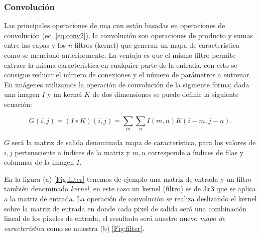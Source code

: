 \subsubsection{Convolución}\label{sub:convolucion}
Las principales operaciones de una \ac{cnn} están basadas en operaciones de convolución (ec. \eqref{eq:conv2}), la convolución son operaciones de producto y sumas entre las capas y los $n$ filtros (kernel) que generan  un mapa de característica como se mencionó anteriormente. La ventaja es que el mismo filtro permite extraer la misma característica en cualquier parte de la entrada, con esto se consigue reducir el número de conexiones y el número de parámetros a entrenar. En imágenes utilizamos la operación de convolución de la siguiente forma; dada una imagen $I$ y un kernel $K$ de dos dimensiones se puede definir la siguiente ecuación:

\begin{equation}\label{eq:conv2}
    G(i, j) = (I ∗ K)(i, j) = \sum_{m} \sum_{n} I(m, n) K(i - m, j - n).
\end{equation} 

$G$ será la matriz de salida denominada mapa de característica, para los valores de $i, j$ perteneciente a índices  de la matriz y $m, n$ corresponde a índices de filas y columnas de la imagen $I$.



En la figura (a) \ref{Fig:filter} tenemos de ejemplo una matriz de entrada y un filtro también denominado \textit{kernel}, en este caso un kernel (filtro) es de $3x3$ que se aplica a la matriz de entrada. La operación de convolución se realiza deslizando el kernel sobre la matriz de entrada en donde cada pixel de salida será una combinación lineal de los pixeles de entrada, el resultado será nuestro nuevo \textit{mapa de característica} como se muestra (b) \ref{Fig:filter}.

